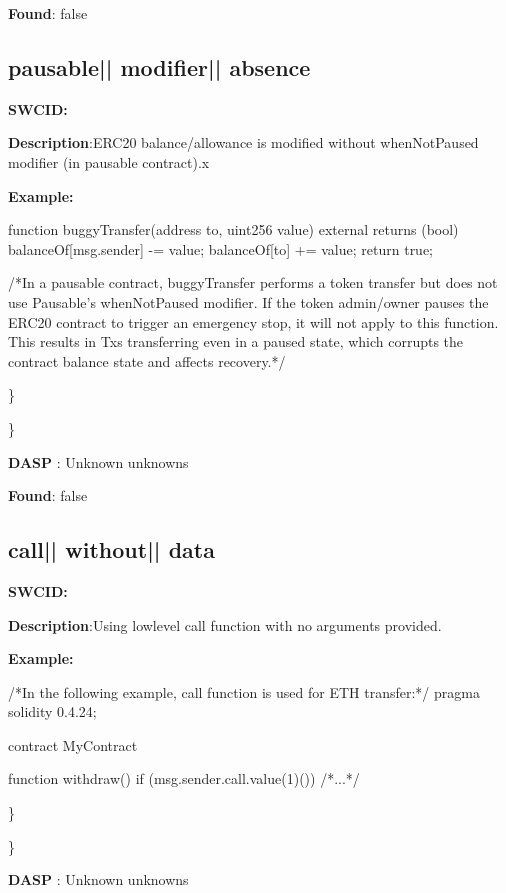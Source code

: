 \documentclass{article}
\begin{document}
\textbf{Found}: false

\subsection{pausable{|\textunderscore| }modifier{|\textunderscore| }absence} 
\textbf{SWC{\textunderscore }ID:} 

\textbf{Description}:ERC20 balance/allowance is modified without whenNotPaused modifier (in pausable contract).x


\textbf{Example:} 
\begin{ffcode} 

function buggyTransfer(address to, uint256 value) external returns (bool){
        balanceOf[msg.sender] -= value;
        balanceOf[to] += value;
        return true;
    }

 /*In a pausable contract, buggyTransfer performs a token transfer but does not use Pausable's whenNotPaused modifier. If the token admin/owner pauses the ERC20 contract to trigger an emergency stop, it will not apply to this function. This results in Txs transferring even in a paused state, which corrupts the contract balance state and affects recovery.*/ 

\end{ffcode} 
\} 

\} 

\textbf{DASP} : Unknown unknowns

\textbf{Found}: false

\subsection{call{|\textunderscore| }without{|\textunderscore| }data} 
\textbf{SWC{\textunderscore }ID:} 

\textbf{Description}:Using low{\textendash}level call function with no arguments provided.


\textbf{Example:} 
\begin{ffcode} 

 /*In the following example, call function is used for ETH transfer:*/ 
pragma solidity 0.4.24;

contract MyContract {

    function withdraw() {
        if (msg.sender.call.value(1)()) {
        /*...*/
        }
    }
}

\end{ffcode} 
\} 

\} 

\textbf{DASP} : Unknown unknowns
\end{document}
